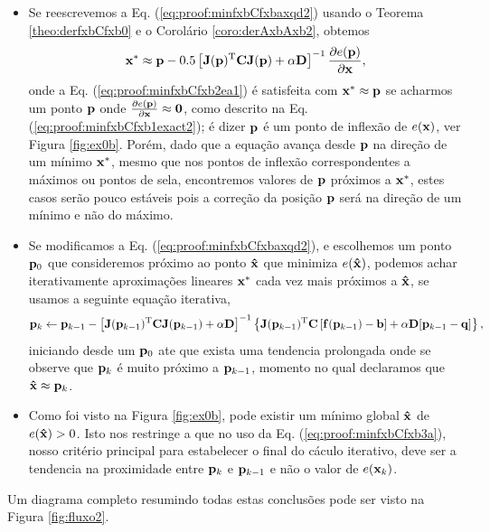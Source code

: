 \begin{myproofT}
\begin{itemize}
\item Se reescrevemos a Eq. (\ref{eq:proof:minfxbCfxbaxqd2}) usando o Teorema \ref{theo:derfxbCfxb0}
e o Corolário \ref{coro:derAxbAxb2},
obtemos
\begin{equation}\label{eq:proof:minfxbCfxb2ea1}
\VECTOR{x}^* \approx \VECTOR{p} -
0.5 \left[ \MATRIX{J}(\VECTOR{p})^{\transpose}\MATRIX{C} \MATRIX{J}(\VECTOR{p})+\alpha \MATRIX{D} \right]^{-1}
\frac{\partial e(\VECTOR{p})}{\partial \VECTOR{x} },
\end{equation}
onde a Eq. (\ref{eq:proof:minfxbCfxb2ea1}) é satisfeita 
com $\VECTOR{x}^* \approx \VECTOR{p}$
se acharmos um  ponto $\VECTOR{p}$ onde  
$\frac{\partial e(\VECTOR{p})}{\partial \VECTOR{x} }\approx \VECTOR{0}$,
 como descrito na Eq. (\ref{eq:proof:minfxbCfxb1exact2}); 
é dizer $\VECTOR{p}$ é um ponto de inflexão de $e(\VECTOR{x})$, ver Figura \ref{fig:ex0b}.
Porém, dado que a equação avança desde $\VECTOR{p}$ na direção de um mínimo $\VECTOR{x}^*$, 
mesmo que nos pontos de inflexão correspondentes a máximos ou pontos de sela,
encontremos valores de $\VECTOR{p}$ próximos a $\VECTOR{x}^*$,
 estes casos serão pouco estáveis pois
a correção da posição $\VECTOR{p}$ será na direção de um mínimo e não do máximo.

\item Se modificamos a Eq. (\ref{eq:proof:minfxbCfxbaxqd2}), e escolhemos um ponto  
$\VECTOR{p}_0$ que consideremos próximo ao ponto $\VECTOR{\hat{x}}$ que minimiza $e(\VECTOR{\hat{x}})$,
podemos achar iterativamente aproximações lineares $\VECTOR{x}^*$ cada vez mais próximos a  $\VECTOR{\hat{x}}$,
se usamos a seguinte equação iterativa,
\begin{equation}\label{eq:proof:minfxbCfxb3a}
\VECTOR{p}_{k} \leftarrow \VECTOR{p}_{k-1} -
\left[ \MATRIX{J}(\VECTOR{p}_{k-1})^{\transpose}\MATRIX{C} \MATRIX{J}(\VECTOR{p}_{k-1}) +\alpha \MATRIX{D}\right]^{-1}
\left\{ \MATRIX{J}(\VECTOR{p}_{k-1})^{\transpose}\MATRIX{C} \left[\VECTOR{f}(\VECTOR{p}_{k-1})-\VECTOR{b}\right]+
\alpha\MATRIX{D}[\VECTOR{p}_{k-1}-\VECTOR{q}]\right\},
\end{equation}
iniciando desde um $\VECTOR{p}_{0}$ 
ate que exista uma tendencia prolongada onde se observe que $\VECTOR{p}_{k}$ é muito próximo a $\VECTOR{p}_{k-1}$,
momento no qual declaramos que $\VECTOR{\hat{x}} \approx \VECTOR{p}_{k}$.
\item Como foi visto na Figura  \ref{fig:ex0b},
pode existir um mínimo global $\VECTOR{\hat{x}}$ de $e(\VECTOR{\hat{x}}) > 0$.
Isto nos restringe a que no uso da Eq. (\ref{eq:proof:minfxbCfxb3a}),
nosso critério principal para estabelecer o final do cáculo iterativo,
deve ser a tendencia na  proximidade entre $\VECTOR{p}_{k}$ e $\VECTOR{p}_{k-1}$ 
e não o valor de $e(\VECTOR{x}_k)$.
\end{itemize}

Um diagrama completo resumindo todas estas conclusões pode ser visto na Figura \ref{fig:fluxo2}.
\end{myproofT}
